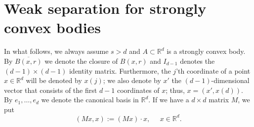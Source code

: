 \documentclass[12pt]{amsart}
\newtheorem{theorem}{Theorem}[section]
\theoremstyle{definition}
\def\R{\mathbb{R}}
\newcommand{\1}{\mathbf{1}}
\begin{document}
\section{Weak separation for strongly convex bodies}\label{sectionconvex}
In what follows, we always assume $s>d$ and $A\subset \R^d$ is a strongly convex body. 
By $\overline{B(x,r)}$ we denote the closure of $B(x,r)$ and $I_{d-1}$ denotes the $(d-1)\times (d-1)$ identity matrix. Furthermore, the $j$'th coordinate of a point $x\in \R^d$ will be denoted by $x(j)$; we also denote by $x'$ the $(d-1)$-dimensional vector that consists of the first $d-1$ coordinates of $x$; thus, $x=(x', x(d))$. By $e_1, \ldots, e_d$ we denote the canonical basis in $\R^d$. If we have a $d\times d$ matrix $M$, we put	
$$
(Mx, x):=(Mx)\cdot x, \;\; \; \; \; x\in \R^d.
$$
\end{document}

